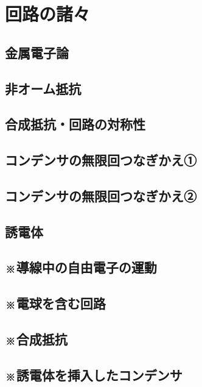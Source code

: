 \documentclass[../../ps_q.tex]{subfiles}
\begin{document}
    \section{回路の諸々}
    \vspace{7pt}
    \subsection{金属電子論}
        
        \vspace{20pt}
        \vfill
    \subsection{非オーム抵抗}
        
        \vspace{20pt}
        \vfill
    \subsection{合成抵抗・回路の対称性}
        
        \vspace{20pt}
        \vfill
    \subsection{コンデンサの無限回つなぎかえ①}
        
        \vspace{20pt}
        \vfill 
    \subsection{コンデンサの無限回つなぎかえ②}
           
        \vspace{20pt}
        \vfill
    \subsection{誘電体}
        
        \vspace{20pt}
        \vfill
    \subsection{※導線中の自由電子の運動}
        
        \vspace{20pt}
        \vfill
    \subsection{※電球を含む回路}
        
        \vspace{20pt}
        \vfill
    \subsection{※合成抵抗}
        
        \vspace{20pt}
        \vfill
    \subsection{※誘電体を挿入したコンデンサ}
        
        \vspace{20pt}
        \vfill
\end{document}
